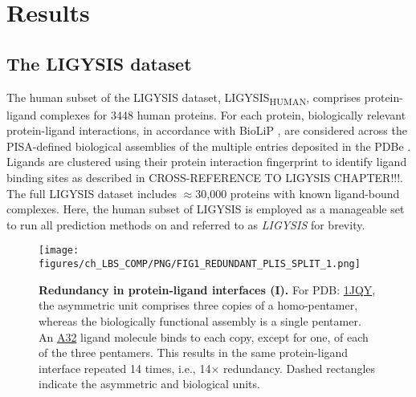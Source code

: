 \section{Results}

\subsection{The LIGYSIS dataset}

The human subset of the LIGYSIS dataset, LIGYSIS\textsubscript{HUMAN}, comprises protein-ligand complexes for 3448 human proteins. For each protein, biologically relevant protein-ligand interactions, in accordance with BioLiP \cite{YANG_2013_BIOLIP}, are considered across the PISA-defined \cite{KRISSINEL_2007_PISA} biological assemblies of the multiple entries deposited in the PDBe \cite{ARMSTRONG_2020_PDBE}. Ligands are clustered using their protein interaction fingerprint to identify ligand binding sites as described in CROSS-REFERENCE TO LIGYSIS CHAPTER!!!. The full LIGYSIS dataset includes $\approx$30,000 proteins with known ligand-bound complexes. Here, the human subset of LIGYSIS is employed as a manageable set to run all prediction methods on and referred to as \textit{LIGYSIS} for brevity.

\begin{figure}[htb!]
    \centering
    \texttt{[image: figures/ch\_LBS\_COMP/PNG/FIG1\_REDUNDANT\_PLIS\_SPLIT\_1.png]}
    \caption[Redundancy in protein-ligand interfaces (I)]{\textbf{Redundancy in protein-ligand interfaces (I).} For PDB: \href{https://www.ebi.ac.uk/pdbe/entry/pdb/1jqy}{1JQY}, the asymmetric unit comprises three copies of a homo-pentamer, whereas the biologically functional assembly is a single pentamer. An \href{https://www.ebi.ac.uk/pdbe-srv/pdbechem/chemicalCompound/show/A32}{A32} ligand molecule binds to each copy, except for one, of each of the three pentamers. This results in the same protein-ligand interface repeated 14 times, i.e., 14$\times$ redundancy. Dashed rectangles indicate the asymmetric and biological units.}
    \label{fig:redundant_plis_1}
\end{figure}


